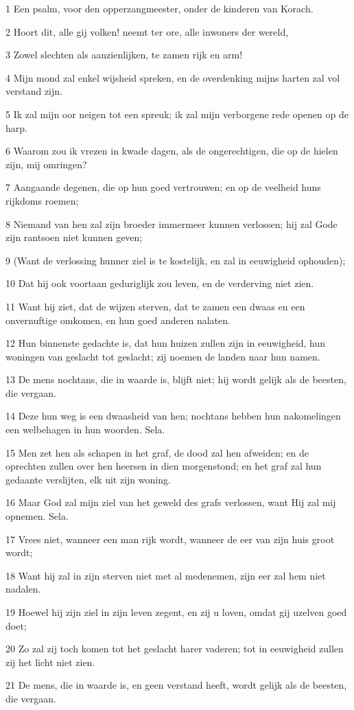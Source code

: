 \par 1 Een psalm, voor den opperzangmeester, onder de kinderen van Korach.
\par 2 Hoort dit, alle gij volken! neemt ter ore, alle inwoners der wereld,
\par 3 Zowel slechten als aanzienlijken, te zamen rijk en arm!
\par 4 Mijn mond zal enkel wijsheid spreken, en de overdenking mijns harten zal vol verstand zijn.
\par 5 Ik zal mijn oor neigen tot een spreuk; ik zal mijn verborgene rede openen op de harp.
\par 6 Waarom zou ik vrezen in kwade dagen, als de ongerechtigen, die op de hielen zijn, mij omringen?
\par 7 Aangaande degenen, die op hun goed vertrouwen; en op de veelheid huns rijkdoms roemen;
\par 8 Niemand van hen zal zijn broeder immermeer kunnen verlossen; hij zal Gode zijn rantsoen niet kunnen geven;
\par 9 (Want de verlossing hunner ziel is te kostelijk, en zal in eeuwigheid ophouden);
\par 10 Dat hij ook voortaan geduriglijk zou leven, en de verderving niet zien.
\par 11 Want hij ziet, dat de wijzen sterven, dat te zamen een dwaas en een onvernuftige omkomen, en hun goed anderen nalaten.
\par 12 Hun binnenste gedachte is, dat hun huizen zullen zijn in eeuwigheid, hun woningen van geslacht tot geslacht; zij noemen de landen naar hun namen.
\par 13 De mens nochtans, die in waarde is, blijft niet; hij wordt gelijk als de beesten, die vergaan.
\par 14 Deze hun weg is een dwaasheid van hen; nochtans hebben hun nakomelingen een welbehagen in hun woorden. Sela.
\par 15 Men zet hen als schapen in het graf, de dood zal hen afweiden; en de oprechten zullen over hen heersen in dien morgenstond; en het graf zal hun gedaante verslijten, elk uit zijn woning.
\par 16 Maar God zal mijn ziel van het geweld des grafs verlossen, want Hij zal mij opnemen. Sela.
\par 17 Vrees niet, wanneer een man rijk wordt, wanneer de eer van zijn huis groot wordt;
\par 18 Want hij zal in zijn sterven niet met al medenemen, zijn eer zal hem niet nadalen.
\par 19 Hoewel hij zijn ziel in zijn leven zegent, en zij u loven, omdat gij uzelven goed doet;
\par 20 Zo zal zij toch komen tot het geslacht harer vaderen; tot in eeuwigheid zullen zij het licht niet zien.
\par 21 De mens, die in waarde is, en geen verstand heeft, wordt gelijk als de beesten, die vergaan.

